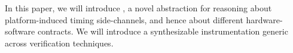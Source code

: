 In this paper, we will introduce \pics, a novel abstraction for reasoning about platform-induced timing side-channels, and hence about different hardware-software contracts.
We will introduce a synthesizable instrumentation generic across verification techniques.







